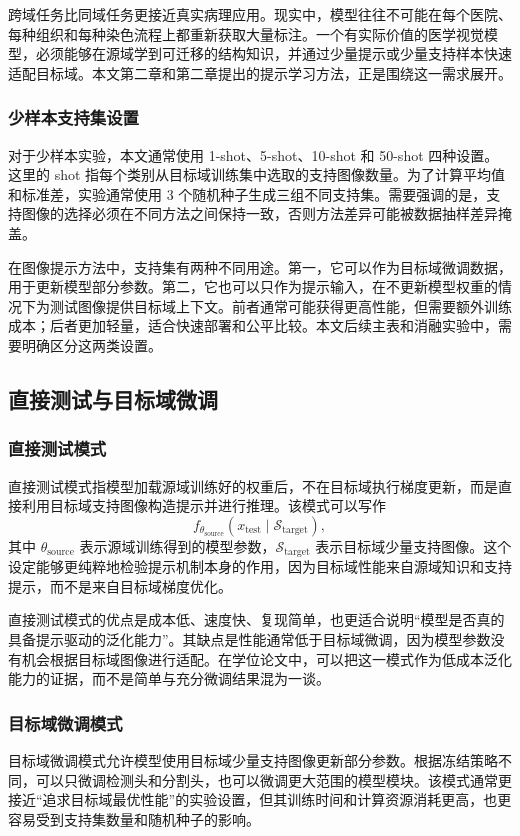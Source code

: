跨域任务比同域任务更接近真实病理应用。现实中，模型往往不可能在每个医院、每种组织和每种染色流程上都重新获取大量标注。一个有实际价值的医学视觉模型，必须能够在源域学到可迁移的结构知识，并通过少量提示或少量支持样本快速适配目标域。本文第二章和第二章提出的提示学习方法，正是围绕这一需求展开。

\subsubsection{少样本支持集设置}
对于少样本实验，本文通常使用 1-shot、5-shot、10-shot 和 50-shot 四种设置。这里的 shot 指每个类别从目标域训练集中选取的支持图像数量。为了计算平均值和标准差，实验通常使用 3 个随机种子生成三组不同支持集。需要强调的是，支持图像的选择必须在不同方法之间保持一致，否则方法差异可能被数据抽样差异掩盖。

在图像提示方法中，支持集有两种不同用途。第一，它可以作为目标域微调数据，用于更新模型部分参数。第二，它也可以只作为提示输入，在不更新模型权重的情况下为测试图像提供目标域上下文。前者通常可能获得更高性能，但需要额外训练成本；后者更加轻量，适合快速部署和公平比较。本文后续主表和消融实验中，需要明确区分这两类设置。

\subsection{直接测试与目标域微调}
\subsubsection{直接测试模式}
直接测试模式指模型加载源域训练好的权重后，不在目标域执行梯度更新，而是直接利用目标域支持图像构造提示并进行推理。该模式可以写作
\[
f_{\theta_{\text{source}}}(x_{\text{test}} \mid \mathcal{S}_{\text{target}}),
\]
其中 $\theta_{\text{source}}$ 表示源域训练得到的模型参数，$\mathcal{S}_{\text{target}}$ 表示目标域少量支持图像。这个设定能够更纯粹地检验提示机制本身的作用，因为目标域性能来自源域知识和支持提示，而不是来自目标域梯度优化。

直接测试模式的优点是成本低、速度快、复现简单，也更适合说明“模型是否真的具备提示驱动的泛化能力”。其缺点是性能通常低于目标域微调，因为模型参数没有机会根据目标域图像进行适配。在学位论文中，可以把这一模式作为低成本泛化能力的证据，而不是简单与充分微调结果混为一谈。

\subsubsection{目标域微调模式}
目标域微调模式允许模型使用目标域少量支持图像更新部分参数。根据冻结策略不同，可以只微调检测头和分割头，也可以微调更大范围的模型模块。该模式通常更接近“追求目标域最优性能”的实验设置，但其训练时间和计算资源消耗更高，也更容易受到支持集数量和随机种子的影响。

